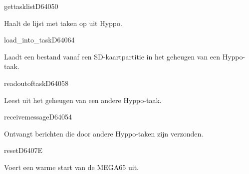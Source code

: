 \newpage
\begin{hyppotrap}{gettasklist}{D640}{50}
\item [Dienst:]  Haalt de lijst met taken op uit Hyppo.
\notimplemented
\end{hyppotrap}


\begin{hyppotrap}{load\_into\_task}{D640}{64}
\item [Dienst:]  Laadt een bestand vanaf een SD-kaartpartitie in het geheugen van een Hyppo-taak.
\notimplemented
\end{hyppotrap}


\begin{hyppotrap}{readoutoftask}{D640}{58}
\item [Dienst:]  Leest uit het geheugen van een andere Hyppo-taak.
\notimplemented
\end{hyppotrap}


\begin{hyppotrap}{receivemessage}{D640}{54}
\item [Dienst:]  Ontvangt berichten die door andere Hyppo-taken zijn verzonden.
\notimplemented
\end{hyppotrap}


\newpage
\begin{hyppotrap}{reset}{D640}{7E}

\item [Dienst:]  Voert een warme start van de MEGA65 uit.
\item [Geschiedenis:]
\end{hyppotrap}


